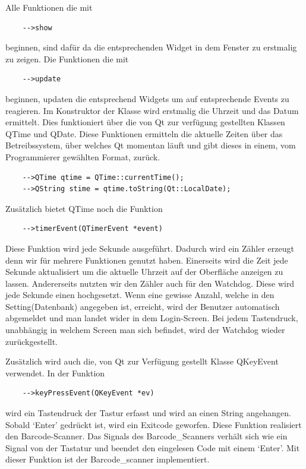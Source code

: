 \documentclass[11pt,a4paper]{article} %
\begin{document}
	Alle Funktionen die mit 
	\begin{frame}

\begin{lstlisting}
	-->show
	\end{lstlisting}
\end{frame}
	beginnen, sind dafür da die entsprechenden Widget in dem Fenster zu erstmalig zu zeigen.
	Die Funktionen die mit 
	\begin{frame}

\begin{lstlisting}
	-->update
	\end{lstlisting}
\end{frame}
	beginnen, updaten die entsprechend Widgets um auf entsprechende Events zu reagieren.
	Im Konstruktor der Klasse wird erstmalig die Uhrzeit und das Datum ermittelt. Dies funktioniert über die von Qt zur verfügung gestellten Klassen QTime und QDate.
	Diese Funktionen ermitteln die aktuelle Zeiten über das Betreibssystem, über welches Qt momentan läuft und gibt dieses in einem, vom Programmierer gewählten Format, zurück.
	
	\begin{frame}

\begin{lstlisting}
	-->QTime qtime = QTime::currentTime();
	-->QString stime = qtime.toString(Qt::LocalDate);
	\end{lstlisting}
\end{frame}
	Zusätzlich bietet QTime noch die Funktion 
	\begin{frame}

\begin{lstlisting}
	-->timerEvent(QTimerEvent *event)
	\end{lstlisting}
\end{frame}
	Diese Funktion wird jede Sekunde ausgeführt. Dadurch wird ein Zähler erzeugt denn wir für mehrere Funktionen genutzt haben.
	Einerseits wird die Zeit jede Sekunde aktualisiert um die aktuelle Uhrzeit auf der Oberfläche anzeigen zu lassen.
	Andererseits nutzten wir den Zähler auch für den Watchdog. Diese wird jede Sekunde einen hochgesetzt. Wenn eine gewisse Anzahl, welche in den Setting(Datenbank) angegeben ist, erreicht, 
	wird der Benutzer automatisch abgemeldet und man landet wider in dem Login-Screen. Bei jedem Tastendruck, unabhängig in welchem Screen man sich befindet, wird der Watchdog wieder zurückgestellt.
\par	
	Zusätzlich wird auch die, von Qt zur Verfügung gestellt Klasse QKeyEvent verwendet. In der Funktion 
	\begin{frame}

\begin{lstlisting}
	-->keyPressEvent(QKeyEvent *ev)
	\end{lstlisting}
\end{frame}
	  wird ein Tastendruck der Tastur erfasst und wird an einen String angehangen.
	Sobald `Enter' gedrückt ist, wird ein Exitcode geworfen. Diese Funktion realisiert den Barcode-Scanner. 
	Das Signals des Barcode\_Scanners verhält sich wie ein Signal von der Tastatur und beendet den eingelesen Code mit einem `Enter'. Mit dieser Funktion ist der Barcode\_scanner implementiert.
\par	
\end{document}
